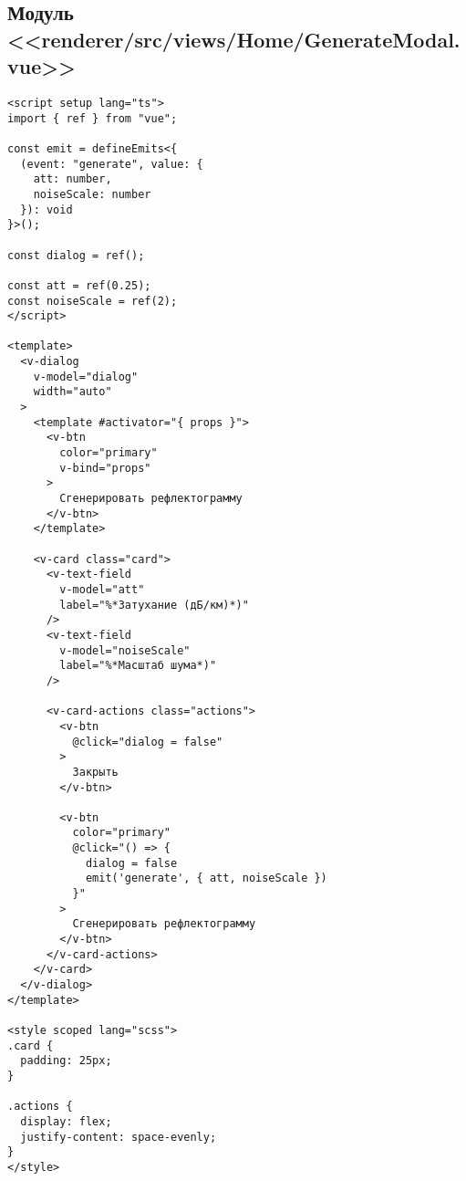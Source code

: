 \subsection{Модуль <<renderer/src/views/Home/GenerateModal.vue>>}
\begin{lstlisting}[language=vue]
<script setup lang="ts">
import { ref } from "vue";

const emit = defineEmits<{
  (event: "generate", value: {
    att: number,
    noiseScale: number
  }): void
}>();

const dialog = ref();

const att = ref(0.25);
const noiseScale = ref(2);
</script>

<template>
  <v-dialog
    v-model="dialog"
    width="auto"
  >
    <template #activator="{ props }">
      <v-btn
        color="primary"
        v-bind="props"
      >
        Сгенерировать рефлектограмму
      </v-btn>
    </template>

    <v-card class="card">
      <v-text-field
        v-model="att"
        label="%*Затухание (дБ/км)*)"
      />
      <v-text-field
        v-model="noiseScale"
        label="%*Масштаб шума*)"
      />

      <v-card-actions class="actions">
        <v-btn
          @click="dialog = false"
        >
          Закрыть
        </v-btn>

        <v-btn
          color="primary"
          @click="() => {
            dialog = false
            emit('generate', { att, noiseScale })
          }"
        >
          Сгенерировать рефлектограмму
        </v-btn>
      </v-card-actions>
    </v-card>
  </v-dialog>
</template>

<style scoped lang="scss">
.card {
  padding: 25px;
}

.actions {
  display: flex;
  justify-content: space-evenly;
}
</style>  
\end{lstlisting}
